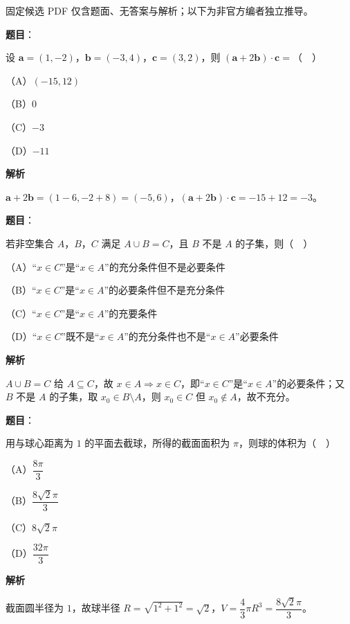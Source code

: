 

\begin{gktip}
固定候选 PDF 仅含题面、无答案与解析；以下为非官方编者独立推导。
\end{gktip}

\begin{answer}

\textbf{题目}：

设 $\boldsymbol a=(1,-2)$，$\boldsymbol b=(-3,4)$，$\boldsymbol c=(3,2)$，则 $(\boldsymbol a+2\boldsymbol b)\cdot\boldsymbol c=$（　）

（A）$(-15,12)$

（B）$0$

（C）$-3$

（D）$-11$

\textbf{解析}

$\boldsymbol a+2\boldsymbol b=(1-6,-2+8)=(-5,6)$，$(\boldsymbol a+2\boldsymbol b)\cdot\boldsymbol c=-15+12=-3$。


\end{answer}
\begin{answer}

\textbf{题目}：

若非空集合 $A$，$B$，$C$ 满足 $A\cup B=C$，且 $B$ 不是 $A$ 的子集，则（　）

（A）“$x\in C$”是“$x\in A$”的充分条件但不是必要条件

（B）“$x\in C$”是“$x\in A$”的必要条件但不是充分条件

（C）“$x\in C$”是“$x\in A$”的充要条件

（D）“$x\in C$”既不是“$x\in A$”的充分条件也不是“$x\in A$”必要条件

\textbf{解析}

$A\cup B=C$ 给 $A\subseteq C$，故 $x\in A\Rightarrow x\in C$，即“$x\in C$”是“$x\in A$”的必要条件；又 $B$ 不是 $A$ 的子集，取 $x_0\in B\setminus A$，则 $x_0\in C$ 但 $x_0\notin A$，故不充分。


\end{answer}
\begin{answer}

\textbf{题目}：

用与球心距离为 $1$ 的平面去截球，所得的截面面积为 $\pi$，则球的体积为（　）

（A）$\dfrac{8\pi}3$

（B）$\dfrac{8\sqrt2\pi}3$

（C）$8\sqrt2\pi$

（D）$\dfrac{32\pi}3$

\textbf{解析}

截面圆半径为 $1$，故球半径 $R=\sqrt{1^2+1^2}=\sqrt2$，$V=\dfrac43\pi R^3=\dfrac{8\sqrt2\pi}3$。


\end{answer}
